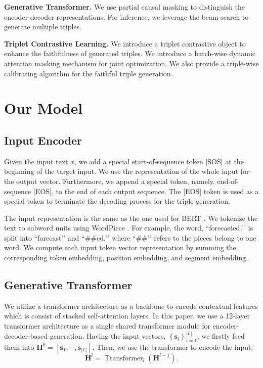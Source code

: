 \documentclass[letterpaper]{article} \usepackage{aaai21}  \usepackage{times}  \usepackage{helvet} \usepackage{courier}  \usepackage[hyphens]{url}  \usepackage{graphicx} \urlstyle{rm} \def\UrlFont{\rm}  \usepackage{natbib}  \usepackage[noend]{algpseudocode}
\begin{document}
\textbf{Generative Transformer.} We use partial causal masking to distinguish the encoder-decoder representations. For inference, we leverage the beam search \cite{wiseman2016sequence} to generate multiple triples.  

\textbf{Triplet Contrastive Learning.} We introduce a triplet contrastive object to enhance the faithfulness of generated triples. We introduce a batch-wise dynamic attention masking mechanism for joint optimization. We also provide a triple-wise calibrating algorithm for the faithful triple generation. 

\section{Our Model}
\subsection{Input Encoder}
Given the input text $x$, we add a special start-of-sequence token [SOS] at the beginning of the target input. We use the representation of the whole input for the output vector.  Furthermore, we append a special token, namely, end-of-sequence [EOS], to the end of each output sequence. The [EOS] token is used as a special token to terminate the decoding process for the triple generation.  

The input representation is the same as the one used for BERT \cite{devlin2018bert}. We tokenize the text to subword units using WordPiece \cite{yonghui2016bridging}. For example, the word, ``forecasted,’’ is split into ``forecast’’ and ``\#\#ed,’’ where ``\#\#’’ refers to the pieces belong to one word. We compute each input token vector representation by summing the corresponding token embedding, position embedding, and segment embedding.  





\subsection{Generative Transformer}

We utilize a  transformer architecture as a backbone to encode contextual features which is consist of stacked self-attention layers. In this paper, we use a 12-layer transformer architecture as a single shared transformer module for encoder-decoder-based generation. Having the input vectors, $\left\{\mathbf{s}_{i}\right\}_{i=1}^{|L|}$, we firstly feed them into $\mathbf{H}^{0}=\left[\mathbf{s}_{1}, \cdots, \mathbf{s}_{|L|}\right]$. Then, we use the transformer to encode the input:
\begin{equation}
    \mathbf{H}^{l}=\operatorname{Transformer}_{l}\left(\mathbf{H}^{l-1}\right).
\end{equation} 
\end{document}
